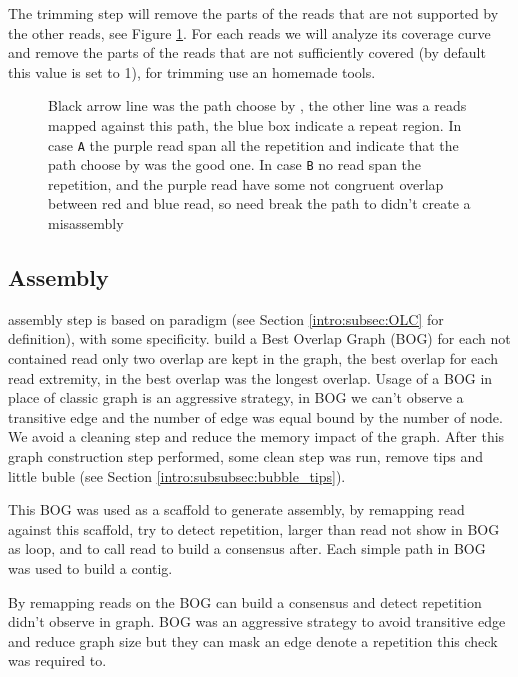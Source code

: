 \documentclass[main]{subfiles}
\begin{document}
The trimming step will remove the parts of the reads that are not supported by the other reads, see Figure \ref{sota:fig:canu:trimming}. For each reads we will analyze its coverage curve and remove the parts of the reads that are not sufficiently covered (by default this value is set to 1), for trimming \canu use an homemade tools. 


\begin{figure}[ht]
    \centering
    
    \caption{Black arrow line was the path choose by \canu, the other line was a reads mapped against this path, the blue box indicate a repeat region. In case \texttt{A} the purple read span all the repetition and indicate that the path choose by \canu was the good one. In case \texttt{B} no read span the repetition, and the purple read have some not congruent overlap between red and blue read, so \canu need break the path to didn't create a misassembly}
    \label{sota:fig:canu:trimming}
\end{figure}

\subsection{Assembly}

\canu assembly step is based on \OLC paradigm (see Section \ref{intro:subsec:OLC} for \OLC definition), with some specificity. \canu build a Best Overlap Graph (BOG) for each not contained read only two overlap are kept in the graph, the best overlap for each read extremity, in \canu the best overlap was the longest overlap. Usage of a BOG in place of classic \OLC graph is an aggressive strategy, in BOG we can't observe a transitive edge and the number of edge was equal bound by the number of node. We avoid a cleaning step and reduce the memory impact of the graph. After this graph construction step performed, some clean step was run, remove tips and little buble (see Section \ref{intro:subsubsec:bubble_tips}).

This BOG was used as a scaffold to generate assembly, by remapping read against this scaffold, \canu try to detect repetition, larger than read not show in BOG as loop, and to call read to build a consensus after. Each simple path in BOG was used to build a contig. 

By remapping reads on the BOG \canu can build a consensus and detect repetition didn't observe in graph. BOG was an aggressive strategy to avoid transitive edge and reduce graph size but they can mask an edge denote a repetition this check was required to.
\end{document}
